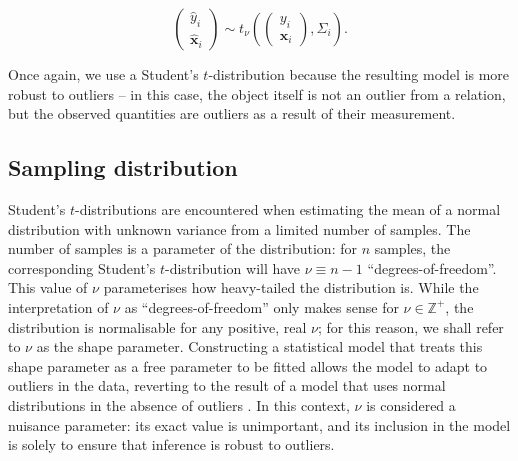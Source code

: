 \documentclass[fleqn,usenatbib]{mnras}
\newcommand{\studentt}[2]{t_\nu \left( #1, #2 \right)}
\newcommand{\depvar}{y_i}
\newcommand{\indepvars}{\boldsymbol{x}_i}
\newcommand{\obsdep}{\hat{y}_i}
\newcommand{\obsindep}{\hat{\boldsymbol{x}}_i}
\newcommand{\obserr}{\Sigma_i}
\begin{document}
\begin{equation}
    \begin{pmatrix}
        \obsdep \\ \obsindep
    \end{pmatrix}
    \sim
    \studentt{
        \begin{pmatrix}
            \depvar \\ \indepvars
        \end{pmatrix}
    }{
        \obserr
    }.
\end{equation}

Once again, we use a Student's $t$-distribution because the resulting model is
more robust to outliers -- in this case, the object itself is not an outlier
from a relation, but the observed quantities are outliers as a result of their
measurement.

\subsection{Sampling distribution}
\label{sec:formalism.sampling}

Student's $t$-distributions are encountered when estimating the mean of a normal
distribution with unknown variance from a limited number of samples. The number
of samples is a parameter of the distribution: for $n$ samples, the
corresponding Student's $t$-distribution will have $\nu \equiv n - 1$
``degrees-of-freedom''. This value of $\nu$ parameterises how heavy-tailed the
distribution is. While the interpretation of $\nu$ as ``degrees-of-freedom''
only makes sense for $\nu \in \mathbb Z^+$, the distribution is normalisable for
any positive, real $\nu$; for this reason, we shall refer to $\nu$ as the shape
parameter. Constructing a statistical model that treats this shape parameter as
a free parameter to be fitted allows the model to adapt to outliers in the data,
reverting to the result of a model that uses normal distributions in the absence
of outliers \citep{Feeney:2018}. In this context, $\nu$ is considered a
nuisance parameter: its exact value is unimportant, and its inclusion in the
model is solely to ensure that inference is robust to outliers.
\end{document}
